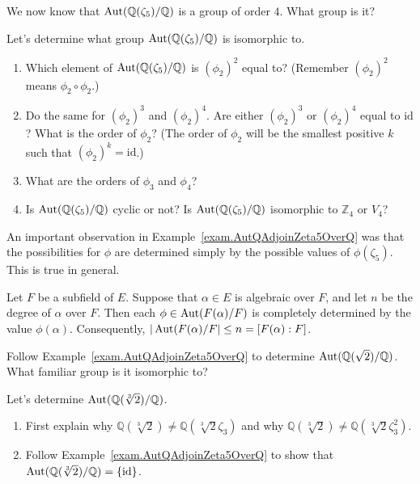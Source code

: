 We now know that $\operatorname{Aut}(\mathbb{Q}(\zeta_5)/\mathbb{Q})$ is a group of order $4$. What group is it? 

\begin{problem}\label{prob.AutQAdjoinZeta5OverQIsZ4}
Let's determine what group $\operatorname{Aut}(\mathbb{Q}(\zeta_5)/\mathbb{Q})$ is isomorphic to. 
\begin{enumerate}
\item Which element of $\operatorname{Aut}(\mathbb{Q}(\zeta_5)/\mathbb{Q})$ is $(\phi_2)^2$ equal to? (Remember $(\phi_2)^2$ means $\phi_2\circ\phi_2$.)
\item Do the same for $(\phi_2)^3$ and $(\phi_2)^4$. Are either $(\phi_2)^3$ or $(\phi_2)^4$ equal to $\text{id}$? What is the order of $\phi_2$? (The order of $\phi_2$ will be the smallest positive $k$ such that $(\phi_2)^k = \text{id}$.)
\item What are the orders of $\phi_3$ and $\phi_4$?
\item Is $\operatorname{Aut}(\mathbb{Q}(\zeta_5)/\mathbb{Q})$ cyclic or not? Is $\operatorname{Aut}(\mathbb{Q}(\zeta_5)/\mathbb{Q})$ isomorphic to $\mathbb{Z}_4$ or $V_4$?
\end{enumerate}
\end{problem}

An important observation in Example~\ref{exam.AutQAdjoinZeta5OverQ} was that the possibilities for $\phi$ are determined simply by the possible values of $\phi(\zeta_5)$. This is true in general.

\begin{fact}\label{fact.AutDeterminedOnGenerator}
Let $F$ be a subfield of $E$. Suppose that $\alpha\in E$ is algebraic over $F$, and let $n$ be the degree of $\alpha$ over $F$. Then each $\phi\in \operatorname{Aut}({F}(\alpha)/F)$ is completely determined by the value $\phi(\alpha)$. Consequently,  $|\operatorname{Aut}({F}(\alpha)/F|\le n = [F(\alpha):F]$.
\end{fact}

\begin{problem}\label{prob.AutQAdjoinSqrt2OverQ}
Follow Example~\ref{exam.AutQAdjoinZeta5OverQ} to determine $\operatorname{Aut}(\mathbb{Q}(\sqrt{2})/\mathbb{Q})$.
What familiar group is  it isomorphic to?
\end{problem}

\begin{problem}\label{prob.AutQAdjoinCubeRoot2OverQ}
Let's determine $\operatorname{Aut}(\mathbb{Q}(\sqrt[3]{2})/\mathbb{Q})$.
\begin{enumerate}
\item First explain why  $\mathbb{Q}(\sqrt[3]{2})\neq \mathbb{Q}(\sqrt[3]{2}\zeta_3)$ and why $\mathbb{Q}(\sqrt[3]{2})\neq \mathbb{Q}(\sqrt[3]{2}\zeta_3^2)$.
\item Follow Example~\ref{exam.AutQAdjoinZeta5OverQ} to show that $\operatorname{Aut}(\mathbb{Q}(\sqrt[3]{2})/\mathbb{Q}) = \{\text{id}\}$.
\end{enumerate}
\end{problem}


